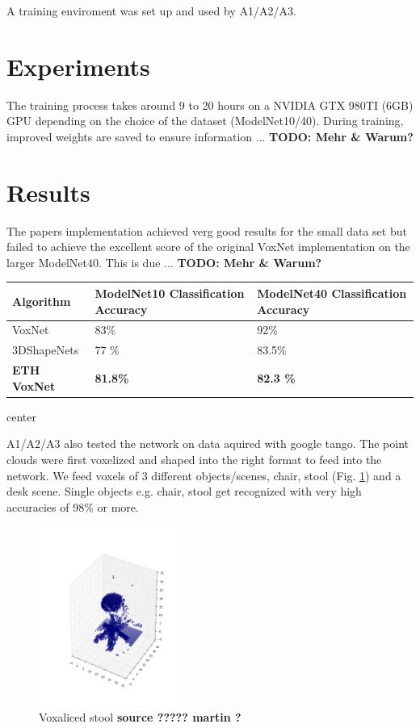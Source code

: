 \documentclass[10pt,twocolumn,letterpaper]{article}
\begin{document}
A training enviroment was set up and used by A1/A2/A3.

\section{Experiments}

The training process takes around 9 to 20 hours on a NVIDIA GTX 980TI (6GB) GPU depending on the choice of the dataset (ModelNet10/40).
During training, improved weights are saved to ensure information ... \textbf{TODO: Mehr \& Warum?} \\ 

\section{Results}

The papers implementation achieved verg good results for the small data set but failed to achieve the excellent score of the 
original VoxNet implementation on the larger ModelNet40. 
This is due ... \textbf{TODO: Mehr \& Warum?} \\ 
\begin{center}
\begin{tabular}{ |p{2.3cm}||p{2.3cm}|p{2.3cm}|  }
 \hline
 Algorithm & ModelNet10 Classification Accuracy  & ModelNet40 Classification Accuracy \\
 \hline
 VoxNet \cite{voxnet}   & 83\% & 92\% \\
 3DShapeNets  \cite{shape}   & 77 \% & 83.5\% \\
\textbf{ETH VoxNet}    & \textbf{81.8\%}   & \textbf{82.3 \%}  \\
 \hline
\end{tabular}
\end{center}{center}

\vspace{0.3cm}
A1/A2/A3 also tested the network on data aquired with google tango. The point clouds were first voxelized
and shaped into the right format to feed into the network. We feed voxels of 3 different objects/scenes, chair, 
stool (Fig. \ref{fig:voxel_stool}) and a desk scene. Single objects e.g. chair, stool get recognized with very high accuracies of 98\% or more.

\begin{figure}[h]
	\label{fig:voxel_stool}
	\centering
	\includegraphics[width=0.42\textwidth]{figures/tango_voxel_stool}
	\caption{Voxaliced stool \textbf{ source ????? martin ?}}
\end{figure}
\end{document}
